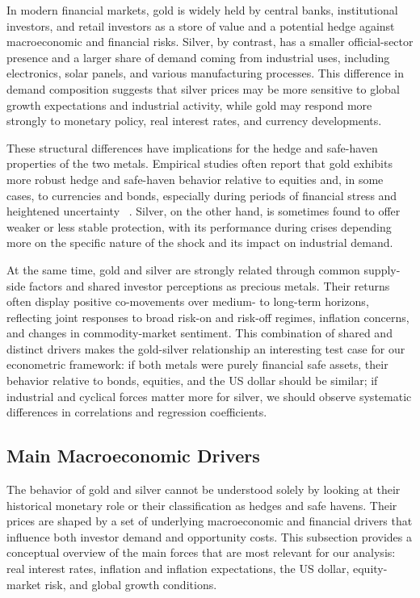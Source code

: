In modern financial markets, gold is widely held by central banks, institutional
investors, and retail investors as a store of value and a potential hedge against
macroeconomic and financial risks. Silver, by contrast, has a smaller official-sector
presence and a larger share of demand coming from industrial uses, including electronics,
solar panels, and various manufacturing processes. This difference in demand composition
suggests that silver prices may be more sensitive to global growth expectations and
industrial activity, while gold may respond more strongly to monetary policy, real
interest rates, and currency developments.

These structural differences have implications for the hedge and safe-haven properties of
the two metals. Empirical studies often report that gold exhibits more robust hedge and
safe-haven behavior relative to equities and, in some cases, to currencies and bonds,
especially during periods of financial stress and heightened uncertainty
~\cite{BaurLucey2010,ErbHarvey2013}. Silver, on the other hand, is sometimes found to offer
weaker or less stable protection, with its performance during crises depending more on the
specific nature of the shock and its impact on industrial demand.

At the same time, gold and silver are strongly related through common supply-side factors
and shared investor perceptions as precious metals. Their returns often display positive
co-movements over medium- to long-term horizons, reflecting joint responses to broad risk-on
and risk-off regimes, inflation concerns, and changes in commodity-market sentiment.
This combination of shared and distinct drivers makes the gold-silver relationship an
interesting test case for our econometric framework: if both metals were purely financial
safe assets, their behavior relative to bonds, equities, and the US dollar should be
similar; if industrial and cyclical forces matter more for silver, we should observe
systematic differences in correlations and regression coefficients.
\subsection{Main Macroeconomic Drivers}

The behavior of gold and silver cannot be understood solely by looking at their historical
monetary role or their classification as hedges and safe havens. Their prices are shaped by
a set of underlying macroeconomic and financial drivers that influence both investor demand
and opportunity costs. This subsection provides a conceptual overview of the main forces
that are most relevant for our analysis: real interest rates, inflation and inflation
expectations, the US dollar, equity-market risk, and global growth conditions.

